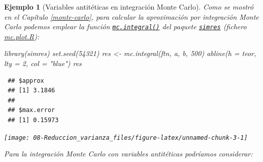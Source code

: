 \documentclass[
  10pt,
]{book}
\newenvironment{Shaded}{\begin{snugshade}}{\end{snugshade}}
\newcommand{\AttributeTok}[1]{\textcolor[rgb]{0.77,0.63,0.00}{#1}}
\newcommand{\DecValTok}[1]{\textcolor[rgb]{0.00,0.00,0.81}{#1}}
\newcommand{\FunctionTok}[1]{\textcolor[rgb]{0.00,0.00,0.00}{#1}}
\newcommand{\NormalTok}[1]{#1}
\newcommand{\OtherTok}[1]{\textcolor[rgb]{0.56,0.35,0.01}{#1}}
\newcommand{\StringTok}[1]{\textcolor[rgb]{0.31,0.60,0.02}{#1}}
\theoremstyle{break}
\newtheorem{example}{Ejemplo}[chapter]
\theoremstyle{nonumberplain}
\begin{document}
\begin{example}[Variables antitéticas en integración Monte Carlo]
Como se mostró en el Capítulo \ref{monte-carlo}, para calcular la aproximación por integración Monte Carlo podemos emplear la función \href{https://rubenfcasal.github.io/simres/reference/mc.integral.html}{\texttt{mc.integral()}} del paquete \href{https://rubenfcasal.github.io/simres}{\texttt{simres}} (fichero \href{R/mc.plot.R}{\emph{mc.plot.R}}):

\begin{Shaded}
\begin{Highlighting}[]
\FunctionTok{library}\NormalTok{(simres)}
\FunctionTok{set.seed}\NormalTok{(}\DecValTok{54321}\NormalTok{)}
\NormalTok{res }\OtherTok{\textless{}{-}} \FunctionTok{mc.integral}\NormalTok{(ftn, a, b, }\DecValTok{500}\NormalTok{)}
\FunctionTok{abline}\NormalTok{(}\AttributeTok{h =}\NormalTok{ teor, }\AttributeTok{lty =} \DecValTok{2}\NormalTok{, }\AttributeTok{col =} \StringTok{"blue"}\NormalTok{)}
\NormalTok{res}
\end{Highlighting}
\end{Shaded}

\begin{verbatim}
 ## $approx
 ## [1] 3.1846
 ## 
 ## $max.error
 ## [1] 0.15973
\end{verbatim}

\begin{center}\texttt{[image: 08-Reduccion\_varianza\_files/figure-latex/unnamed-chunk-3-1]} \end{center}

Para la integración Monte Carlo con variables antitéticas podríamos considerar:


\end{example}
\end{document}
